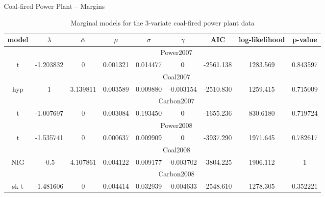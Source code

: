 {Coal-fired Power Plant -- Margins} \tiny
\begin{table}[ht]
                \begin{center}
                    \begin{tabular}{c|c|c|c|c|c|c|c|c}
                        model&$\lambda$&$\overline{\alpha}$&$\mu$&$\sigma$&$\gamma$&AIC&log-likelihood&p-value\\\hline
                        &\multicolumn{8}{c}{Power2007}\\\cline{2-9}
                        t&-1.203832&0&0.001321&0.014477&0&-2561.138&1283.569&0.843597\\\hline
                        &\multicolumn{8}{c}{Coal2007}\\\cline{2-9}
                        hyp&1&3.139811&0.003589&0.009880&-0.003154&-2510.830&1259.415&0.715009\\\hline
                        &\multicolumn{8}{c}{Carbon2007}\\\cline{2-9}
                        t&-1.007697&0&0.003084&0.193450&0&-1655.236&830.6180&0.719724\\\hline
                        &\multicolumn{8}{c}{Power2008}\\\cline{2-9}
                        t&-1.535741&0&0.000637&0.009909&0&-3937.290&1971.645&0.782617\\\hline
                        &\multicolumn{8}{c}{Coal2008}\\\cline{2-9}
                        NIG&-0.5&4.107861&0.004122&0.009177&-0.003702&-3804.225&1906.112&1\\\hline
                        &\multicolumn{8}{c}{Carbon2008}\\\cline{2-9}
                        sk t&-1.481606&0&0.004414&0.032939&-0.004633&-2548.610&1278.305&0.352221\\\hline
                    \end{tabular}
                    \caption{Marginal models for the 3-variate coal-fired power plant data}
                \end{center}
            \end{table}
